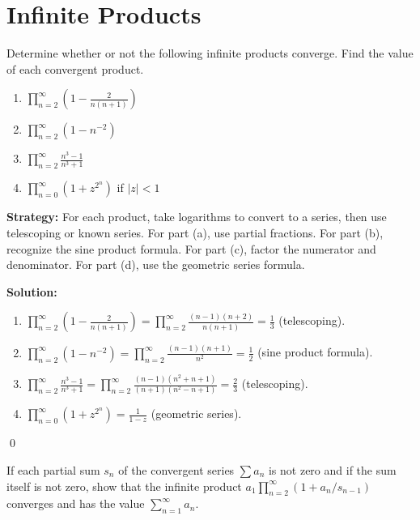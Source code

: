 \section{Infinite Products}



\begin{problembox}
\begin{problemstatement}
Determine whether or not the following infinite products converge. Find the value of each convergent product.
\begin{enumerate}[label=\alph*)]
\item \(\prod_{n=2}^{\infty} \left( 1 - \frac{2}{n(n+1)} \right)\)
\item \(\prod_{n=2}^{\infty} (1 - n^{-2})\)
\item \(\prod_{n=2}^{\infty} \frac{n^3 - 1}{n^3 + 1}\)
\item \(\prod_{n=0}^{\infty} (1 + z^{2^n})\) if \(|z| < 1\)
\end{enumerate}
\end{problemstatement}
\end{problembox}

\noindent\textbf{Strategy:} For each product, take logarithms to convert to a series, then use telescoping or known series. For part (a), use partial fractions. For part (b), recognize the sine product formula. For part (c), factor the numerator and denominator. For part (d), use the geometric series formula.

\bigskip\noindent\textbf{Solution:}
\begin{enumerate}[label=(\alph*)]
\item \(\prod_{n=2}^{\infty} \left( 1 - \frac{2}{n(n+1)} \right) = \prod_{n=2}^{\infty} \frac{(n-1)(n+2)}{n(n+1)} = \frac{1}{3}\) (telescoping).
\item \(\prod_{n=2}^{\infty} (1 - n^{-2}) = \prod_{n=2}^{\infty} \frac{(n-1)(n+1)}{n^2} = \frac{1}{2}\) (sine product formula).
\item \(\prod_{n=2}^{\infty} \frac{n^3 - 1}{n^3 + 1} = \prod_{n=2}^{\infty} \frac{(n-1)(n^2+n+1)}{(n+1)(n^2-n+1)} = \frac{2}{3}\) (telescoping).
\item \(\prod_{n=0}^{\infty} (1 + z^{2^n}) = \frac{1}{1-z}\) (geometric series).
\end{enumerate}\qed



\begin{problembox}
\begin{problemstatement}
If each partial sum \(s_n\) of the convergent series \(\sum a_n\) is not zero and if the sum itself is not zero, show that the infinite product \(a_1 \prod_{n=2}^{\infty} (1 + a_n / s_{n-1})\) converges and has the value \(\sum_{n=1}^{\infty} a_n\).
\end{problemstatement}
\end{problembox}

